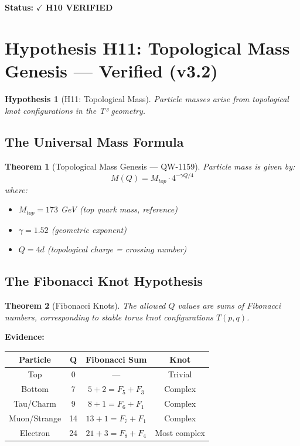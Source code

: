 \documentclass[11pt, a4paper]{article}
\newtheorem{theorem}{Theorem}[section]
\newtheorem{hypothesis}{Hypothesis}[section]
\theoremstyle{remark}
\begin{document}
\textbf{Status:} $\checkmark$ \textbf{H10 VERIFIED}

\section{Hypothesis H11: Topological Mass Genesis --- Verified (v3.2)}

\begin{hypothesis}[H11: Topological Mass]
Particle masses arise from topological knot configurations in the T³ geometry.
\end{hypothesis}

\subsection{The Universal Mass Formula}

\begin{theorem}[Topological Mass Genesis --- QW-1159]
Particle mass is given by:
\begin{equation}
\boxed{M(Q) = M_{top} \cdot 4^{-\gamma Q/4}}
\end{equation}
where:
\begin{itemize}
    \item $M_{top} = 173$ GeV (top quark mass, reference)
    \item $\gamma = 1.52$ (geometric exponent)
    \item $Q = 4d$ (topological charge = crossing number)
\end{itemize}
\end{theorem}

\subsection{The Fibonacci Knot Hypothesis}

\begin{theorem}[Fibonacci Knots]
The allowed $Q$ values are sums of Fibonacci numbers, corresponding to stable torus knot configurations $T(p,q)$.
\end{theorem}

\textbf{Evidence:}
\begin{center}
\begin{tabular}{|c|c|c|c|}
\hline
\textbf{Particle} & \textbf{Q} & \textbf{Fibonacci Sum} & \textbf{Knot} \\
\hline
Top & 0 & --- & Trivial \\
Bottom & 7 & $5 + 2 = F_5 + F_3$ & Complex \\
Tau/Charm & 9 & $8 + 1 = F_6 + F_1$ & Complex \\
Muon/Strange & 14 & $13 + 1 = F_7 + F_1$ & Complex \\
Electron & 24 & $21 + 3 = F_8 + F_4$ & Most complex \\
\hline
\end{tabular}
\end{center}
\end{document}
